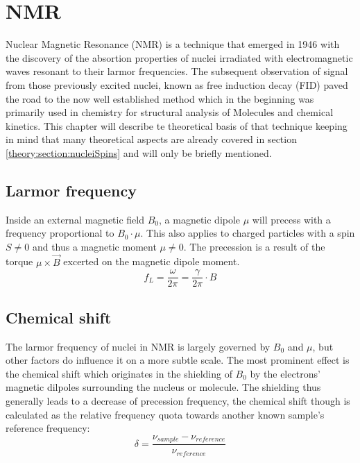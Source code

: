     \section{NMR}
        Nuclear Magnetic Resonance (NMR) is a technique that emerged in 1946 with the discovery
        of the absortion properties of nuclei irradiated with electromagnetic waves resonant to their
        larmor frequencies.\cite{ResonanceAbsorption} The subsequent observation of signal from those
        previously excited nuclei, known as free induction decay (FID) paved the road to the now well
        established method which in the beginning was primarily used in chemistry for structural
        analysis of Molecules and chemical kinetics. This chapter will describe te theoretical basis of that technique keeping in mind that many theoretical aspects are already covered in section \ref{theory:section:nucleiSpins} and will only be briefly mentioned.
        \subsection{Larmor frequency}
        \label{section:theory:larmorFrequency}
            Inside an external magnetic field $B_0$, a magnetic dipole $\mu$ will precess with a frequency
            proportional to $B_0\cdot \mu$. This also applies to charged particles with a spin $S\neq0$ and thus
            a magnetic moment $\mu\neq0$. The precession is a result of the torque $\mu\times\vec B$
            excerted on the magnetic dipole moment.
            \begin{equation}
                f_L=\frac{\omega}{2\pi} = \frac{\gamma}{2\pi}\cdot B
            \end{equation}
        \subsection{Chemical shift}
            The larmor frequency of nuclei in NMR is largely governed by $B_0$ and $\mu$, but other factors do
            influence it on a more subtle scale. The most prominent effect is the chemical shift which
            originates in the shielding of $B_0$ by the electrons' magnetic dilpoles surrounding the nucleus or molecule.
            The shielding thus generally leads to a decrease of precession frequency, the chemical shift
            though is calculated as the relative frequency quota towards another known sample's
            reference frequency:
            \begin{equation}
                \delta = \frac{\nu_{sample} - \nu_{reference}}{\nu_{reference}}
            \end{equation}
